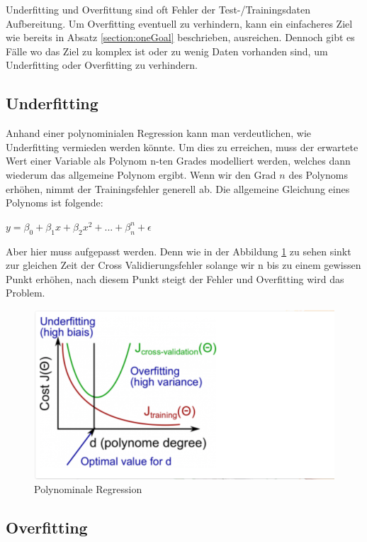 \documentclass[12pt,oneside,a4paper,parskip]{scrbook}
\begin{document}
Underfitting und Overfittung sind oft Fehler der Test-/Trainingsdaten Aufbereitung. Um Overfitting eventuell zu verhindern, kann ein einfacheres Ziel wie bereits in Absatz \ref{section:oneGoal} beschrieben, ausreichen. Dennoch gibt es Fälle wo das Ziel zu komplex ist oder zu wenig Daten vorhanden sind, um Underfitting oder Overfitting zu verhindern.

\subsection{Underfitting}

Anhand einer polynominialen Regression kann man verdeutlichen, wie Underfitting vermieden werden könnte. Um dies zu erreichen, muss der erwartete Wert einer Variable als Polynom n-ten Grades modelliert werden, welches dann wiederum das allgemeine Polynom ergibt. Wenn wir den Grad ${n}$ des Polynoms erhöhen, nimmt der Trainingsfehler generell ab. Die allgemeine Gleichung eines Polynoms ist folgende:

${\displaystyle y=\beta_{0}+\beta_{1}x+\beta_{2}x^{2}+...+\beta_{n}^n+\epsilon}$

Aber hier muss aufgepasst werden. Denn wie in der Abbildung \ref{fig:polyReg} zu sehen sinkt zur gleichen Zeit der Cross Validierungsfehler solange wir n bis zu einem gewissen Punkt erhöhen, nach diesem Punkt steigt der Fehler und Overfitting wird das Problem.

\begin{figure}[h]
	\begin{center}
		\includegraphics[width=15cm]{Bilder/polynomeRegression.png}
		\caption{Polynominale Regression}
		\label{fig:polyReg}
	\end{center}
\end{figure}

\subsection{Overfitting}
\end{document}
